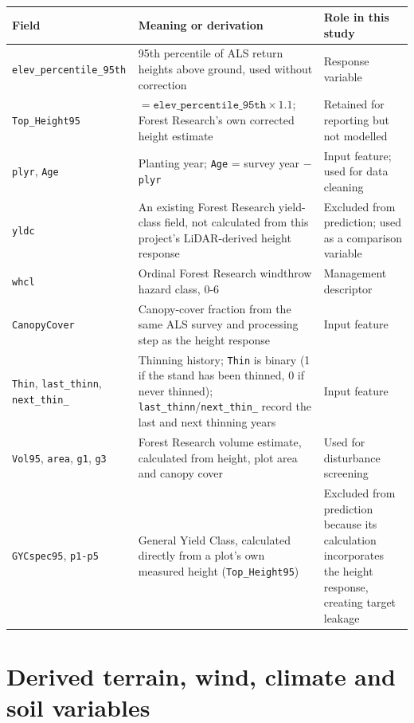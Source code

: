 \begin{table}[!htbp]
\scriptsize
\setlength{\tabcolsep}{3pt}
\renewcommand{\arraystretch}{0.95}
\begin{tabular}{p{2.6cm}p{7.0cm}p{3.2cm}}
\hline
Field & Meaning or derivation & Role in this study \\
\hline
\texttt{elev\_percentile\_95th} & 95th percentile of ALS return heights above ground, used without correction & Response variable \\
\texttt{Top\_Height95} & $=\texttt{elev\_percentile\_95th}\times1.1$; Forest Research's own corrected height estimate & Retained for reporting but not modelled \\
\texttt{plyr}, \texttt{Age} & Planting year; \texttt{Age} = survey year $-$ \texttt{plyr} & Input feature; used for data cleaning \\
\texttt{yldc} & An existing Forest Research yield-class field, not calculated from this project's LiDAR-derived height response & Excluded from prediction; used as a comparison variable \\
\texttt{whcl} & Ordinal Forest Research windthrow hazard class, 0-6 & Management descriptor \\
\texttt{CanopyCover} & Canopy-cover fraction from the same ALS survey and processing step as the height response & Input feature \\
\texttt{Thin}, \texttt{last\_thinn}, \texttt{next\_thin\_} & Thinning history; \texttt{Thin} is binary (1 if the stand has been thinned, 0 if never thinned); \texttt{last\_thinn}/\texttt{next\_thin\_} record the last and next thinning years & Input feature \\
\texttt{Vol95}, \texttt{area}, \texttt{g1}, \texttt{g3} & Forest Research volume estimate, calculated from height, plot area and canopy cover & Used for disturbance screening \\
\texttt{GYCspec95}, \texttt{p1-p5} & General Yield Class, calculated directly from a plot's own measured height (\texttt{Top\_Height95}) \ct{Forest Research, "Use of Airborne Laser Scanning (ALS) for Forest Inventory" - source of p1-p5, full reference not yet confirmed} & Excluded from prediction because its calculation
incorporates the height response, creating target leakage \\
\hline
\end{tabular}
\caption{}
\label{tab:data-fields}
\end{table}
\section{Derived terrain, wind, climate and soil variables}
\label{sec:data-environmental}

